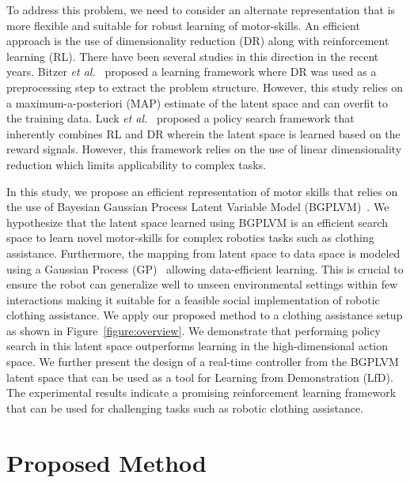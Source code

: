 \documentclass{article}
\begin{document}
To address this problem, we need to consider an alternate representation that is more flexible and suitable for robust learning of motor-skills. An efficient approach is the use of dimensionality reduction (DR) along with reinforcement learning (RL). There have been several studies in this direction in the recent years. Bitzer \emph{et al.}~\cite{bitzer} proposed a learning framework where DR was used as a preprocessing step to extract the problem structure. However, this study relies on a maximum-a-posteriori (MAP) estimate of the latent space and can overfit to the training data. Luck \emph{et al.}~\cite{luck} proposed a policy search framework that inherently combines RL and DR wherein the latent space is learned based on the reward signals. However, this framework relies on the use of linear dimensionality reduction which limits applicability to complex tasks.

In this study, we propose an efficient representation of motor skills that relies on the use of Bayesian Gaussian Process Latent Variable Model (BGPLVM)~\cite{bgplvm}. We hypothesize that the latent space learned using BGPLVM is an efficient search space to learn novel motor-skills for complex robotics tasks such as clothing assistance. Furthermore, the mapping from latent space to data space is modeled using a Gaussian Process (GP)~\cite{gp} allowing data-efficient learning. This is crucial to ensure the robot can generalize well to unseen environmental settings within few interactions making it suitable for a feasible social implementation of robotic clothing assistance. We apply our proposed method to a clothing assistance setup as shown in Figure~\ref{figure:overview}. We demonstrate that performing policy search in this latent space outperforms learning in the high-dimensional action space. We further present the design of a real-time controller from the BGPLVM latent space that can be used as a tool for Learning from Demonstration (LfD). The experimental results indicate a promising reinforcement learning framework that can be used for challenging tasks such as robotic clothing assistance.

\section{Proposed Method}
\label{section:method}
\end{document}
